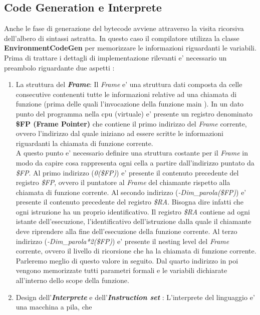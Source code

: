 \documentclass{article}
\begin{document}
\subsection{Code Generation e Interprete}
Anche le fase di generazione del bytecode avviene attraverso la visita ricorsiva dell'albero di sintassi astratta. In questo caso il compilatore utilizza la classe \textbf{EnvironmentCodeGen} per memorizzare le informazioni riguardanti le variabili. Prima di trattare i dettagli di implementazione rilevanti e' necessario un preambolo riguardante due aspetti : \\
\begin{enumerate}
    \item La struttura del \textbf{\textit{Frame}}:
    Il \textit{Frame} e' una struttura dati composta da celle consecutive contenenti tutte le informazioni relative ad una chiamata di funzione (prima delle quali l'invocazione della funzione main ). In un dato punto del programma nella cpu (virtuale) e' presente un registro denominato \textbf{\$FP (Frame Pointer)} che contiene il primo indirizzo del \textit{Frame} corrente, ovvero l'indirizzo dal quale iniziano ad essere scritte le informazioni riguardanti la chiamata di funzione corrente. \\
    A questo punto e' necessario definire una struttura costante per il \textit{Frame} in modo da capire cosa rappresenta ogni cella a partire dall'indirizzo puntato da \textit{\$FP}. Al primo indirizzo (\textit{0(\$FP)}) e' presente il contenuto precedente del registro \textit{\$FP}, ovvero il puntatore al \textit{Frame} del chiamante rispetto alla chiamata di funzione corrente. Al secondo indirizzo (\textit{-Dim\_parola(\$FP)}) e' presente il contenuto precedente del registro \textit{\$RA}. Bisogna dire infatti che ogni istruzione ha un proprio identificativo. Il registro \textit{\$RA} contiene ad ogni istante dell'esecuzione, l'identificativo dell'istruzione dalla quale il chiamante deve riprendere alla fine dell'esecuzione della funzione corrente. Al terzo indirizzo (\textit{-Dim\_parola*2(\$FP)}) e' presente il nesting level del \textit{Frame} corrente, ovvero il livello di ricorsione che ha la chiamata di funzione corrente. Parleremo meglio di questo valore in seguito. Dal quarto indirizzo in poi vengono memorizzate tutti parametri formali e le variabili dichiarate all'interno dello scope della funzione.
    \item Design dell'\textbf{\textit{Interprete}} e dell'\textbf{\textit{Instruction set}} : 
    L'interprete del linguaggio e' una macchina a pila, che 

\end{enumerate}
\end{document}
